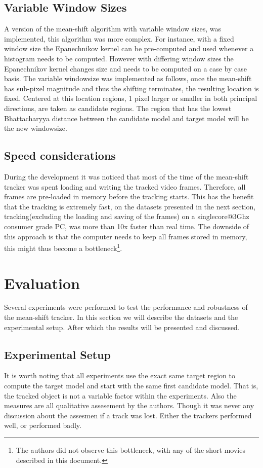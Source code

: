 \documentclass[a4paper,11pt]{article}
\begin{document}
\subsection{Variable Window Sizes}
A version of the mean-shift algorithm with variable window sizes, was implemented, this algorithm was more complex. For instance, with a fixed window size the Epanechnikov kernel can be pre-computed and used whenever a histogram needs to be computed. However with differing window sizes the Epanechnikov kernel changes size and needs to be computed on a case by case basis. 
The variable windowsize was implemented as follows, once the mean-shift has sub-pixel magnitude and thus the shifting terminates, the resulting location is fixed. Centered at this location regions, 1 pixel larger or smaller in both principal directions, are taken as candidate regions. The region that has the lowest Bhattacharyya distance between the candidate model and target model will be the new windowsize.     
  
\subsection{Speed considerations}
During the development it was noticed that most of the time of the mean-shift tracker was spent loading and writing the tracked video frames. Therefore, all frames are pre-loaded in memory before the tracking starts. This has the benefit that the tracking is extremely fast, on the datasets presented in the next section, tracking(excluding the loading and saving of the frames) on a singlecore@3Ghz consumer grade PC, was more than 10x faster than real time. The downside of this approach is that the computer needs to keep all frames stored in memory, this might thus become a bottleneck\footnote{The authors did not observe this bottleneck, with any of the short movies described in this document.}.

\section{Evaluation} 
Several experiments were performed to test the performance and robustness of the mean-shift tracker. In this section we will describe the datasets and the experimental setup. After which the results will be presented and discussed.
 
\subsection{Experimental Setup}
It is worth noting that all experiments use the exact same target region to compute the target model and start with the same first candidate model.  That is, the tracked object is not a variable factor within the experiments. Also the measures are all qualitative assesement by the authors. Though it was never any discussion about the assesmen if a track was lost. Either the trackers performed well, or performed badly.
\end{document}
